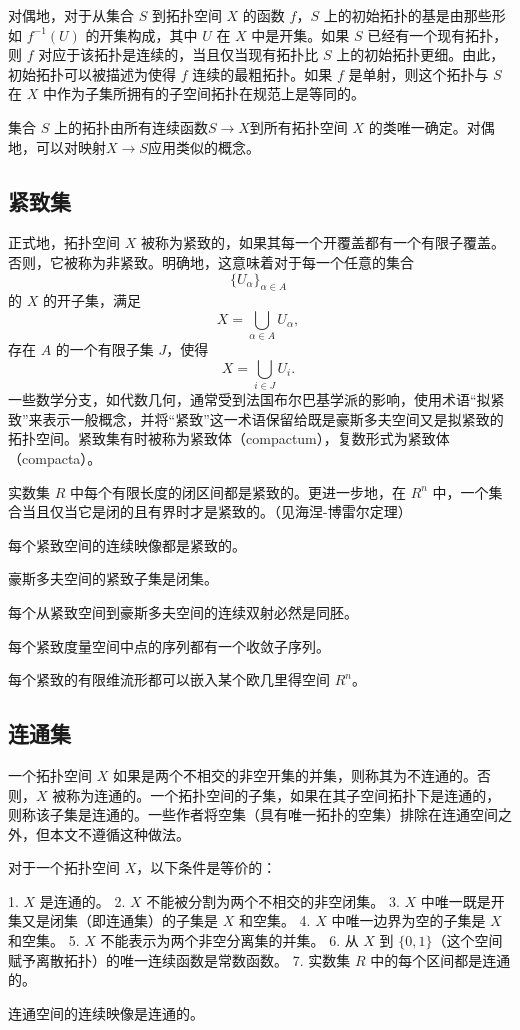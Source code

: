对偶地，对于从集合 $S$ 到拓扑空间 $X$ 的函数 $f$，$S$ 上的初始拓扑的基是由那些形如 $f^{-1}(U)$ 的开集构成，其中 $U$ 在 $X$ 中是开集。如果 $S$ 已经有一个现有拓扑，则 $f$ 对应于该拓扑是连续的，当且仅当现有拓扑比 $S$ 上的初始拓扑更细。由此，初始拓扑可以被描述为使得 $f$ 连续的最粗拓扑。如果 $f$ 是单射，则这个拓扑与 $S$ 在 $X$ 中作为子集所拥有的子空间拓扑在规范上是等同的。

集合 $S$ 上的拓扑由所有连续函数$S \rightarrow X$到所有拓扑空间 $X$ 的类唯一确定。对偶地，可以对映射$X \rightarrow S$应用类似的概念。
\subsection{紧致集}
正式地，拓扑空间 $X$ 被称为紧致的，如果其每一个开覆盖都有一个有限子覆盖。否则，它被称为非紧致。明确地，这意味着对于每一个任意的集合
$$
\{ U_{\alpha} \}_{\alpha \in A}~
$$
的 $X$ 的开子集，满足
$$
X = \bigcup_{\alpha \in A} U_{\alpha},~
$$
存在 $A$ 的一个有限子集 $J$，使得
$$
X = \bigcup_{i \in J} U_i.~
$$
一些数学分支，如代数几何，通常受到法国布尔巴基学派的影响，使用术语“拟紧致”来表示一般概念，并将“紧致”这一术语保留给既是豪斯多夫空间又是拟紧致的拓扑空间。紧致集有时被称为紧致体（compactum），复数形式为紧致体（compacta）。

实数集 $R$ 中每个有限长度的闭区间都是紧致的。更进一步地，在 $R^n$ 中，一个集合当且仅当它是闭的且有界时才是紧致的。（见海涅-博雷尔定理）

每个紧致空间的连续映像都是紧致的。

豪斯多夫空间的紧致子集是闭集。

每个从紧致空间到豪斯多夫空间的连续双射必然是同胚。

每个紧致度量空间中点的序列都有一个收敛子序列。

每个紧致的有限维流形都可以嵌入某个欧几里得空间 $R^n$。
\subsection{连通集}
一个拓扑空间 $X$ 如果是两个不相交的非空开集的并集，则称其为不连通的。否则，$X$ 被称为连通的。一个拓扑空间的子集，如果在其子空间拓扑下是连通的，则称该子集是连通的。一些作者将空集（具有唯一拓扑的空集）排除在连通空间之外，但本文不遵循这种做法。

对于一个拓扑空间 $X$，以下条件是等价的：

1. $X$ 是连通的。
2. $X$ 不能被分割为两个不相交的非空闭集。
3. $X$ 中唯一既是开集又是闭集（即连通集）的子集是 $X$ 和空集。
4. $X$ 中唯一边界为空的子集是 $X$ 和空集。
5. $X$ 不能表示为两个非空分离集的并集。
6. 从 $X$ 到 $\{0,1\}$（这个空间赋予离散拓扑）的唯一连续函数是常数函数。
7. 实数集 $R$ 中的每个区间都是连通的。

连通空间的连续映像是连通的。

